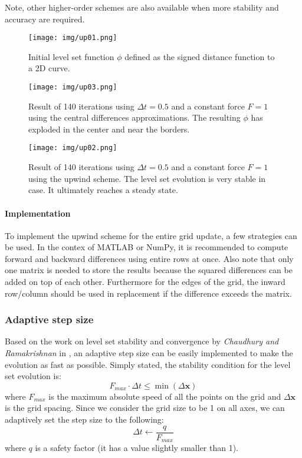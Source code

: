 \documentclass{article}
\begin{document}
Note, other higher-order schemes are also available when more stability and
accuracy are required.

\begin{figure}
  \centering
  \texttt{[image: img/up01.png]}
  \caption{Initial level set function $\phi$ defined as the signed distance
    function to a 2D curve.}
  \label{fig:up1}
\end{figure}

\begin{figure}
  \centering
  \texttt{[image: img/up03.png]}
  \caption{Result of 140 iterations using $\Delta t = 0.5$ and a constant
    force $F=1$ using the central differences approximations. The resulting
    $\phi$ has exploded in the center and near the borders.}
  \label{fig:up2}
\end{figure}

\begin{figure}
  \centering
  \texttt{[image: img/up02.png]}
  \caption{Result of 140 iterations using $\Delta t = 0.5$ and a constant
    force $F=1$ using the upwind scheme. The level set evolution is very
    stable in case. It ultimately reaches a steady state.}
  \label{fig:up3}
\end{figure}

\paragraph{Implementation}
To implement the upwind scheme for the entire grid update, a few strategies
can be used. In the contex of \textsc{MATLAB} or NumPy, it is recommended to
compute forward and backward differences using entire rows at once. Also note
that only one matrix is needed to store the results because the squared
differences can be added on top of each other.  Furthermore for the edges of
the grid, the inward row/column should be used in replacement if the
difference exceeds the matrix.

\subsubsection{Adaptive step size}
Based on the work on level set stability and convergence by \textit{Chaudhury
and Ramakrishnan} in \cite{chaudhury2007stability}, an adaptive step size can be
easily implemented to make the evolution as fast as possible. Simply stated, the
stability condition for the level set evolution is:
\[
F_{max} \cdot \Delta t \le \min(\Delta \mathbf{x})
\]
where $F_{max}$ is the maximum absolute speed of all the points on the grid and
$\Delta \mathbf{x}$ is the grid spacing. Since we consider the grid size to be
1 on all axes, we can adaptively set the step size to the following:
\[
\Delta t \leftarrow \frac{q}{F_{max}}
\]
where $q$ is a safety factor (it has a value slightly smaller than 1).
\end{document}
